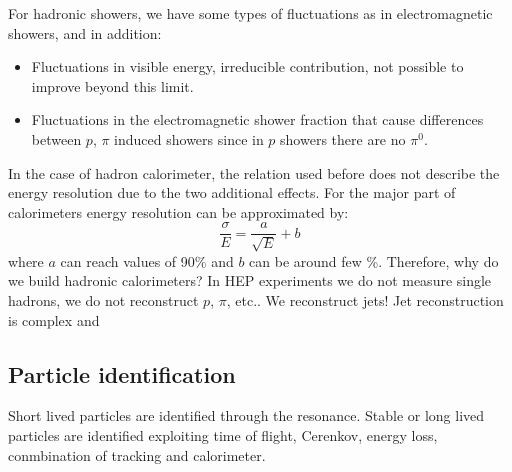 \documentclass[../../main/main.tex]{subfiles}
\begin{document}
For hadronic showers, we have some types of fluctuations as in electromagnetic showers, and in addition:
\begin{itemize}
	\item Fluctuations in visible energy, irreducible contribution, not possible to improve beyond this limit.
	\item Fluctuations in the electromagnetic shower fraction that cause differences between \( p \), \( \pi \) induced showers since in \( p \) showers there are no \( \pi^0 \).
\end{itemize}
In the case of hadron calorimeter, the relation used before does not describe the energy resolution due to the two additional effects. For the major part of calorimeters energy resolution can be approximated by:
\begin{equation}
	\frac{\sigma}{E}
	=
	\frac{a}{\sqrt{E}} + b
	\label{eq:}
\end{equation}
where \( a \) can reach values of 90\% and \( b \) can be around few \%. Therefore, why do we build hadronic calorimeters? In HEP experiments we do not measure single hadrons, we do not reconstruct \( p \), \( \pi \), etc.. We reconstruct jets! Jet reconstruction is complex and %



\subsection{Particle identification}
Short lived particles are identified through the resonance. Stable or long lived particles are identified exploiting time of flight, Cerenkov, energy loss, conmbination of tracking and calorimeter.
\end{document}
